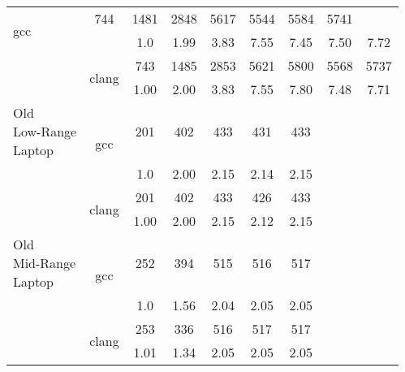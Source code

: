 \begin{table}[H]
\begin{tabularx}{\linewidth}{X c c c c c c c c}
\multirow{2}{*}{gcc} & 744 & 1481 & 2848 & 5617 & 5544 & 5584 & 5741\\
 & & 1.0 & 1.99 & 3.83 & 7.55 & 7.45 & 7.50 & 7.72\\
\cmidrule[0.05em](){3-9} & 
\multirow{2}{*}{clang} & 743 & 1485 & 2853 & 5621 & 5800 & 5568 & 5737\\
 & & 1.00 & 2.00 & 3.83 & 7.55 & 7.80 & 7.48 & 7.71\\
            \midrule
\multirowcell{4}{Old\\ Low-Range\\ Laptop} & 
\multirow{2}{*}{gcc} & 201 & 402 & 433 & 431 & 433\\
 & & 1.0 & 2.00 & 2.15 & 2.14 & 2.15\\
\cmidrule[0.05em](){3-9} & 
\multirow{2}{*}{clang} & 201 & 402 & 433 & 426 & 433\\
 & & 1.00 & 2.00 & 2.15 & 2.12 & 2.15\\
            \midrule
\multirowcell{4}{Old\\ Mid-Range\\ Laptop} & 
\multirow{2}{*}{gcc} & 252 & 394 & 515 & 516 & 517\\
 & & 1.0 & 1.56 & 2.04 & 2.05 & 2.05\\
\cmidrule[0.05em](){3-9} & 
\multirow{2}{*}{clang} & 253 & 336 & 516 & 517 & 517\\
 & & 1.01 & 1.34 & 2.05 & 2.05 & 2.05 \\
            \bottomrule
        \end{tabularx}
    \end{table}
    